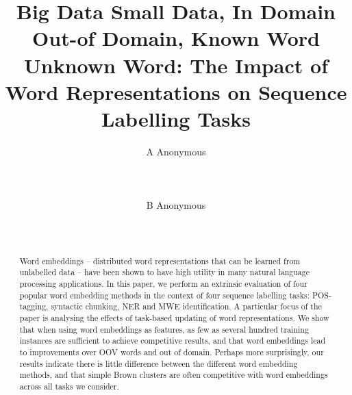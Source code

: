 \documentclass[11pt]{article}
\title{Big Data Small Data, In Domain Out-of Domain, Known Word Unknown
  Word: The Impact of Word Representations on Sequence Labelling Tasks}
\author{A Anonymous 
   \\%
   \\ %
   \\ %
  \\ %
\And
  B Anonymous
   \\%
   \\%
   \\ %
}
\date{}
\begin{document}
\maketitle


\begin{abstract} 
  Word embeddings -- distributed word representations that can be
  learned from unlabelled data -- have been shown to have high utility
  in many natural language processing applications. 
  In this paper, we perform an extrinsic evaluation of four popular word
  embedding methods in the context of four sequence labelling tasks:
  POS-tagging, syntactic chunking, NER and MWE identification.
  A particular focus of the paper is analysing the effects of task-based
  updating of word representations.
  We show that when using word embeddings as features, as few as
  several hundred training instances are sufficient to achieve competitive
  results, and that word embeddings lead to improvements over OOV words
  and out of domain.
  Perhaps more surprisingly, our results indicate there is little
  difference between the different word embedding methods, and that simple
  Brown clusters are often competitive with word embeddings across all
  tasks we consider. 
\end{abstract}

\newcommand{\gabi}[1]{\textcolor{blue}{#1}}
\newcommand{\tim}[1]{\textcolor{red}{#1}}
\newcommand{\lizhen}[1]{\textcolor{green}{#1}}
\newcommand{\nss}[1]{\textcolor{magenta}{#1}}













\end{document}
